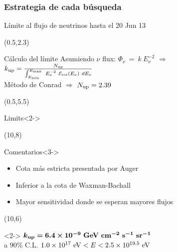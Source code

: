 \begin{frame}
 \frametitle{Estrategia de cada b\'usqueda}
 \begin{center}
 \end{center}
\end{frame}

\begin{frame}{L\'imite al flujo de neutrinos hasta el 20 Jun 13}
	\scriptsize
		\begin{textblock}{15}(0.5,2.3)
			\begin{alertblock}{C\'alculo del l\'imite}
				\centering
				Asumiendo $\nu$ flux: $\Phi_\nu ~ = ~ k ~ E_\nu^{-2}$ $\Rightarrow$ $k_{\rm up} = \frac{N_{\rm up}}{\int_{E_{\rm min}}^{E_{\rm max}}~E_{\nu}^{-2}~{\cal E}_{\rm tot}(E_\nu)~dE_\nu}$
				\\
				M\'etodo de Conrad $\Rightarrow$ $N_{\rm up} = 2.39$
			\end{alertblock}
		\end{textblock}	
		
		\begin{textblock}{9}(0.5,5.5)
			\begin{block}{Limits}<2->
			\begin{overprint}
				\centerline{}
			\end{overprint}
			\end{block}
		\end{textblock}
		
		\begin{textblock}{5.6}(10,8)
			\begin{exampleblock}{Comentarios}<3->
				\begin{itemize}
				\item Cota m\'as estricta presentada por Auger
				\item Inferior a la cota de Waxman-Bachall
				\item Mayor sensitividad donde se esperan mayores flujos
				\end{itemize}
			\end{exampleblock}
		\end{textblock}
% 		
		\begin{textblock}{5.6}(10,6)
			\begin{alertblock}{}<2->
			\centering
			\tiny
			$\bm{ k_{\rm up}=6.4 \times 10^{-9}~{\rm GeV~cm^{-2}~s^{-1}~sr^{-1}}}$
			\\ a $90\%$ C.L. $1.0\times10^{17}~{\rm eV}<E<2.5\times10^{19.5}~{\rm eV}$
			\end{alertblock}
		\end{textblock}
\end{frame}

